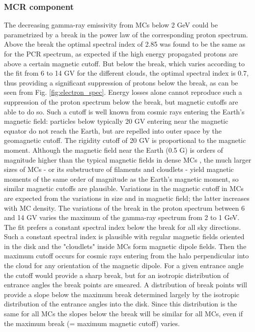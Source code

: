 \subsubsection{MCR component}
The decreasing gamma-ray emissivity from MCs below 2 GeV could be parametrized by a break in the power law of the corresponding proton spectrum. Above the break the optimal spectral index of 2.85 was found to be the same as for the PCR spectrum, as expected if the high energy propagated protons are above a certain magnetic cutoff. But below the break, which varies according to the fit from 6 to 14 GV for the different clouds, the optimal spectral index is 0.7, thus providing a significant suppression of protons below the break, as can be seen from Fig. \ref{fig:electron_spec}. Energy losses alone cannot reproduce such a suppression of the proton spectrum below the break, but magnetic cutoffs are able to do so. Such a cutoff is well known from cosmic rays entering the Earth's magnetic field: particles below typically 20 GV entering near the magnetic equator do not reach the Earth, but are repelled into outer space by the geomagnetic cutoff.  The rigidity cutoff of 20 GV is proportional to the magnetic moment. Although the magnetic field near the Earth (0.5 G) is orders of magnitude higher than the typical magnetic fields in dense MCs , the much larger sizes of MCs - or its substructure of filaments and cloudlets  - yield magnetic moments of the same order of magnitude as the Earth's magnetic moment, so similar magnetic cutoffs are plausible. Variations in the magnetic cutoff in MCs are expected from the variations in size and in magnetic field; the latter increases with MC density.  The variations of the break in the proton spectrum between 6 and 14 GV varies the maximum of the gamma-ray spectrum from 2 to 1 GeV.
The fit prefers a constant spectral index below the break for all sky directions. Such a constant spectral index is plausible with regular magnetic fields oriented in the disk  and the "cloudlets" inside MCs  form magnetic dipole fields. Then the maximum cutoff occurs for cosmic rays entering from the halo perpendicular into the cloud for any orientation of the magnetic dipole. For a given entrance angle the cutoff would provide a sharp break, but for an isotropic distribution of entrance angles the break points are smeared. A distribution of break points will provide a slope below the maximum break determined largely by the isotropic distribution of the entrance angles into the disk. Since this distribution is the same for all MCs the slopes below the break will be similar for all MCs, even if the maximum break (= maximum magnetic cutoff) varies.


